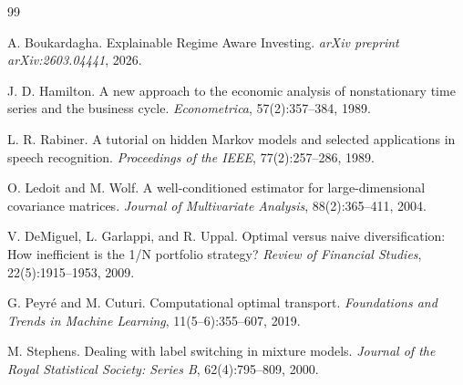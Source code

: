 \documentclass[11pt]{article}
\begin{document}
\begin{thebibliography}{99}

A. Boukardagha.
\newblock Explainable Regime Aware Investing.
\newblock \emph{arXiv preprint arXiv:2603.04441}, 2026.

J. D. Hamilton.
\newblock A new approach to the economic analysis of nonstationary time series and the business cycle.
\newblock \emph{Econometrica}, 57(2):357--384, 1989.

L. R. Rabiner.
\newblock A tutorial on hidden Markov models and selected applications in speech recognition.
\newblock \emph{Proceedings of the IEEE}, 77(2):257--286, 1989.

O. Ledoit and M. Wolf.
\newblock A well-conditioned estimator for large-dimensional covariance matrices.
\newblock \emph{Journal of Multivariate Analysis}, 88(2):365--411, 2004.

V. DeMiguel, L. Garlappi, and R. Uppal.
\newblock Optimal versus naive diversification: How inefficient is the 1/N portfolio strategy?
\newblock \emph{Review of Financial Studies}, 22(5):1915--1953, 2009.

G. Peyr\'e and M. Cuturi.
\newblock Computational optimal transport.
\newblock \emph{Foundations and Trends in Machine Learning}, 11(5--6):355--607, 2019.

M. Stephens.
\newblock Dealing with label switching in mixture models.
\newblock \emph{Journal of the Royal Statistical Society: Series B}, 62(4):795--809, 2000.

\end{thebibliography}
\end{document}
